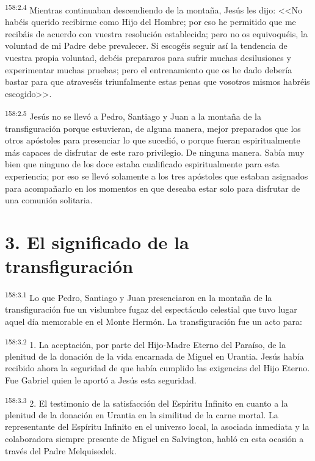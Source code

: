 \par 
\textsuperscript{158:2.4} Mientras continuaban descendiendo de la montaña, Jesús les dijo: <<No habéis querido recibirme como Hijo del Hombre; por eso he permitido que me recibáis de acuerdo con vuestra resolución establecida; pero no os equivoquéis, la voluntad de mi Padre debe prevalecer. Si escogéis seguir así la tendencia de vuestra propia voluntad, debéis prepararos para sufrir muchas desilusiones y experimentar muchas pruebas; pero el entrenamiento que os he dado debería bastar para que atraveséis triunfalmente estas penas que vosotros mismos habréis escogido>>.

\par 
\textsuperscript{158:2.5} Jesús no se llevó a Pedro, Santiago y Juan a la montaña de la transfiguración porque estuvieran, de alguna manera, mejor preparados que los otros apóstoles para presenciar lo que sucedió, o porque fueran espiritualmente más capaces de disfrutar de este raro privilegio. De ninguna manera. Sabía muy bien que ninguno de los doce estaba cualificado espiritualmente para esta experiencia; por eso se llevó solamente a los tres apóstoles que estaban asignados para acompañarlo en los momentos en que deseaba estar solo para disfrutar de una comunión solitaria.

\section*{3. El significado de la transfiguración}
\par 
\textsuperscript{158:3.1} Lo que Pedro, Santiago y Juan presenciaron en la montaña de la transfiguración fue un vislumbre fugaz del espectáculo celestial que tuvo lugar aquel día memorable en el Monte Hermón. La transfiguración fue un acto para:

\par 
\textsuperscript{158:3.2} 1. La aceptación, por parte del Hijo-Madre Eterno del Paraíso, de la plenitud de la donación de la vida encarnada de Miguel en Urantia. Jesús había recibido ahora la seguridad de que había cumplido las exigencias del Hijo Eterno. Fue Gabriel quien le aportó a Jesús esta seguridad.

\par 
\textsuperscript{158:3.3} 2. El testimonio de la satisfacción del Espíritu Infinito en cuanto a la plenitud de la donación en Urantia en la similitud de la carne mortal. La representante del Espíritu Infinito en el universo local, la asociada inmediata y la colaboradora siempre presente de Miguel en Salvington, habló en esta ocasión a través del Padre Melquisedek.

